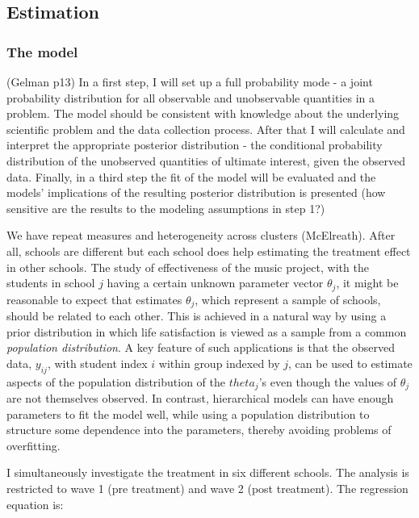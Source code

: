 \documentclass[a4, 12pt]{article}
\begin{document}
\hypertarget{estimation}{%
\subsection{Estimation}\label{estimation}}

\hypertarget{the-model}{%
\subsubsection{The model}\label{the-model}}

\label{estimation}
(Gelman p13)
In a first step, I will set up a full probability mode - a joint probability distribution for all observable and unobservable quantities in a problem. The model should be consistent with knowledge about the underlying scientific problem and the data collection process.
After that I will calculate and interpret the appropriate posterior distribution - the conditional probability distribution of the unobserved quantities of ultimate interest, given the observed data.
Finally, in a third step the fit of the model will be evaluated and the models' implications of the resulting posterior distribution is presented (how sensitive are the results to the modeling assumptions in step 1?)

We have repeat measures and heterogeneity across clusters (McElreath). After all, schools are different but each school does help estimating the treatment effect in other schools.
The study of effectiveness of the music project, with the students in school \(j\) having a certain unknown parameter vector \(\theta_j\), it might be reasonable to expect that estimates \(\theta_j\), which represent a sample of schools, should be related to each other. This is achieved in a natural way by using a prior distribution in which life satisfaction is viewed as a sample from a common \emph{population distribution}. A key feature of such applications is that the observed data, \(y_{ij}\), with student index \(i\) within group indexed by \(j\), can be used to estimate aspects of the population distribution of the \(theta_j\)'s even though the values of \(\theta_j\) are not themselves observed. In contrast, hierarchical models can have enough parameters to fit the model well, while using a population distribution to structure some dependence into the parameters, thereby avoiding problems of overfitting.

I simultaneously investigate the treatment in six different schools. The analysis is restricted to wave 1 (pre treatment) and wave 2 (post treatment). The regression equation is:
\end{document}
